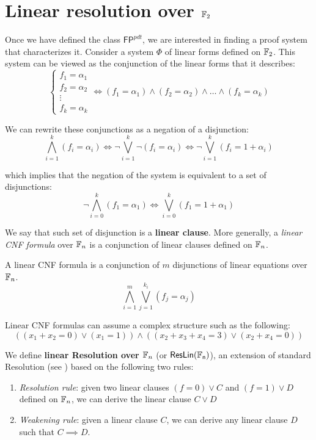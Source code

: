 \section{Linear resolution over $\mathbb{F}_2$}

Once we have defined the class $\mathsf{FP}^{pdt}$, we are interested in finding a proof system that characterizes it. Consider a system $\Phi$ of linear forms defined on $\mathbb{F}_2$. This system can be viewed as the conjunction of the linear forms that it describes:
\[\left \{ \begin{array}{c}
    f_1 = \alpha_1 \\
    f_2 = \alpha_2 \\
    \vdots \\
    f_k = \alpha_k
\end{array}\right . \iff (f_1 = \alpha_1) \land (f_2 = \alpha_2) \land \ldots \land (f_k = \alpha_k)\]

We can rewrite these conjunctions as a negation of a disjunction:
\[\bigwedge_{i = 1}^k (f_i = \alpha_i) \iff \lnot \bigvee_{i = 1}^k \lnot (f_i = \alpha_i) \iff \lnot \bigvee_{i = 1}^k (f_i = 1 + \alpha_i)\]

which implies that the negation of the system is equivalent to a set of disjunctions:
\[\lnot \bigwedge_{i = 0}^k (f_1 = \alpha_1) \iff \bigvee_{i = 0}^k (f_1 = 1 + \alpha_1)\]

We say that such set of disjunction is a \textbf{linear clause}. More generally, a \textit{linear CNF formula} over $\mathbb{F}_n$ is a conjunction of linear clauses defined on $\mathbb{F}_n$.

\begin{definition}
    A linear CNF formula is a conjunction of $m$ disjunctions of linear equations over $\mathbb{F}_n$.
    \[\bigwedge_{i = 1}^m \bigvee_{j = 1}^{k_i} (f_j = \alpha_j)\]
\end{definition}

Linear CNF formulas can assume a complex structure such as the following:
\[((x_1+x_2 = 0) \lor (x_1 = 1)) \land ((x_2 + x_3 + x_4 = 3) \lor (x_2 + x_4 = 0))\]

\newpage

We define \textbf{linear Resolution over $\mathbb{F}_n$} (or $\mathsf{ResLin(\mathbb{F}_n)}$), an extension of standard Resolution (see ) based on the following two rules:
\begin{enumerate}
    \item \textit{Resolution rule}: given two linear clauses $(f = 0) \lor C$ and $(f = 1) \lor D$ defined on $\mathbb{F}_n$, we can derive the linear clause $C \lor D$
    \item \textit{Weakening rule}: given a linear clause $C$, we can derive any linear clause $D$ such that $C \implies D$.
\end{enumerate}

